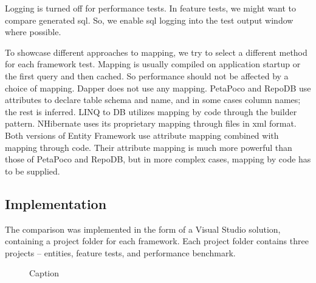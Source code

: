 Logging is turned off for performance tests. In feature tests, we might want to compare generated \acrshort{sql}. So, we enable \acrshort{sql} logging into the test output window where possible.

To showcase different approaches to mapping, we try to select a different method for each framework test. Mapping is usually compiled on application startup or the first query and then cached. So performance should not be affected by a choice of mapping. Dapper does not use any mapping. PetaPoco and RepoDB use attributes to declare table schema and name, and in some cases column names; the rest is inferred. LINQ to DB utilizes mapping by code through the builder pattern. NHibernate uses its proprietary mapping through files in \acrshort{xml} format. Both versions of Entity Framework use attribute mapping combined with mapping through code. Their attribute mapping is much more powerful than those of PetaPoco and RepoDB, but in more complex cases, mapping by code has to be supplied.

\subsection{Implementation}
The comparison was implemented in the form of a Visual Studio solution, containing a project folder for each framework. Each project folder contains three projects -- entities, feature tests, and performance benchmark. 

\begin{figure}[h!]
\usetikzlibrary{positioning, arrows}
\begin{center}
\end{center}
    
    \caption{Caption}
    \label{fig:enter-label}
\end{figure}

